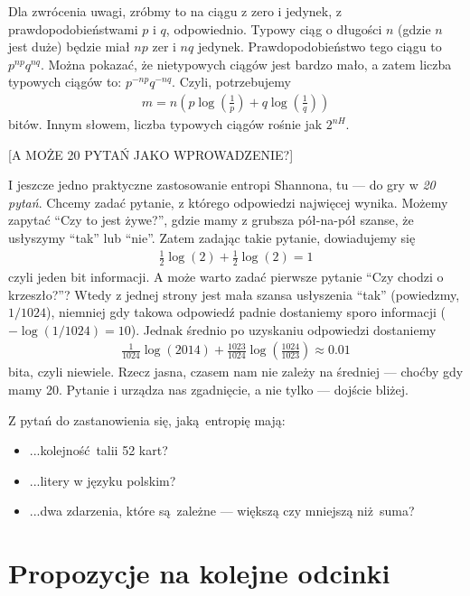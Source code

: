 \documentclass[10pt,a4paper]{article}
\begin{document}
Dla zwrócenia uwagi, zróbmy to na ciągu z zero i jedynek, z prawdopodobieństwami $p$ i $q$, odpowiednio.
Typowy ciąg o długości $n$ (gdzie $n$ jest duże) będzie miał $n p$ zer i $n q$ jedynek.
Prawdopodobieństwo tego ciągu to $p^{n p}q^{n q}$.
Można pokazać, że nietypowych ciągów jest bardzo mało, a zatem liczba typowych ciągów to:
$p^{-n p}q^{-n q}$.
Czyli, potrzebujemy
%
\begin{align}
    m=n \left( p \log(\tfrac{1}{p}) + q \log(\tfrac{1}{q}) \right)
\end{align}
%
bitów.
Innym słowem, liczba typowych ciągów rośnie jak $2^{n H}$.


[A MOŻE 20 PYTAŃ JAKO WPROWADZENIE?]

I jeszcze jedno praktyczne zastosowanie entropi Shannona, tu --- do gry w \emph{20 pytań}.
Chcemy zadać pytanie, z którego odpowiedzi najwięcej wynika.
Możemy zapytać ``Czy to jest żywe?'', gdzie mamy z grubsza pół-na-pół szanse, że usłyszymy ``tak'' lub ``nie''.
Zatem zadając takie pytanie, dowiadujemy się
%
\begin{align}
    \tfrac{1}{2} \log(2) + \tfrac{1}{2} \log(2)  = 1
\end{align}
%
czyli jeden bit informacji. 
A może warto zadać pierwsze pytanie ``Czy chodzi o krzeszło?''?
Wtedy z jednej strony jest mała szansa usłyszenia ``tak'' (powiedzmy, $1/1024$),
niemniej gdy takowa odpowiedź padnie dostaniemy sporo informacji  ($-\log(1/1024)=10$).
Jednak średnio po uzyskaniu odpowiedzi dostaniemy
%
\begin{align}
    \tfrac{1}{1024} \log(2014) + \tfrac{1023}{1024} \log(\tfrac{1024}{1023}) \approx 0.01
\end{align}
%
bita, czyli niewiele.
Rzecz jasna, czasem nam nie zależy na średniej --- choćby gdy mamy 20.
Pytanie i urządza nas zgadnięcie, a nie tylko --- dojście bliżej.

Z pytań do zastanowienia się, jaką entropię mają:
\begin{itemize}
    \item ...kolejność talii 52 kart?
    \item ...litery w języku polskim?
    \item ...dwa zdarzenia, które są zależne --- większą czy mniejszą niż suma?
\end{itemize}


\section{Propozycje na kolejne odcinki}
\end{document}
